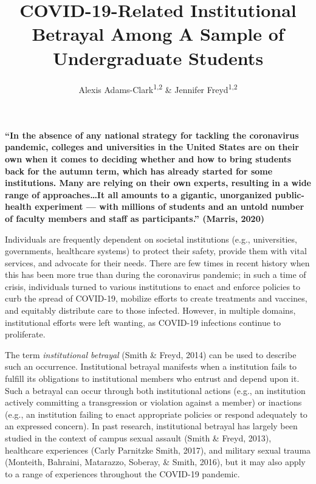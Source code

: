 \documentclass[
  english,
  man, noextraspace]{apa6}
\title{\textbf{COVID-19-Related Institutional Betrayal Among A Sample of Undergraduate Students}}
\author{Alexis Adams-Clark\textsuperscript{1,2} \& Jennifer Freyd\textsuperscript{1,2}}
\date{}
\affiliation{\vspace{0.5cm}\textsuperscript{1} University of Oregon\\\textsuperscript{2} Center for Institutional Courage}
\begin{document}
\maketitle

\raggedbottom
\centering

\textbf{\enquote{In the absence of any national strategy for tackling the coronavirus pandemic, colleges and universities in the United States are on their own when it comes to deciding whether and how to bring students back for the autumn term, which has already started for some institutions. Many are relying on their own experts, resulting in a wide range of approaches\ldots It all amounts to a gigantic, unorganized public-health experiment --- with millions of students and an untold number of faculty members and staff as participants.} (Marris, 2020)}

\raggedright

\setlength{\parindent}{5ex}

Individuals are frequently dependent on societal institutions (e.g., universities, governments, healthcare systems) to protect their safety, provide them with vital services, and advocate for their needs. There are few times in recent history when this has been more true than during the coronavirus pandemic; in such a time of crisis, individuals turned to various institutions to enact and enforce policies to curb the spread of COVID-19, mobilize efforts to create treatments and vaccines, and equitably distribute care to those infected. However, in multiple domains, institutional efforts were left wanting, as COVID-19 infections continue to proliferate.

The term \emph{institutional betrayal} (Smith \& Freyd, 2014) can be used to describe such an occurrence. Institutional betrayal manifests when a institution fails to fulfill its obligations to institutional members who entrust and depend upon it. Such a betrayal can occur through both institutional actions (e.g., an institution actively committing a transgression or violation against a member) or inactions (e.g., an institution failing to enact appropriate policies or respond adequately to an expressed concern). In past research, institutional betrayal has largely been studied in the context of campus sexual assault (Smith \& Freyd, 2013), healthcare experiences (Carly Parnitzke Smith, 2017), and military sexual trauma (Monteith, Bahraini, Matarazzo, Soberay, \& Smith, 2016), but it may also apply to a range of experiences throughout the COVID-19 pandemic.
\end{document}
